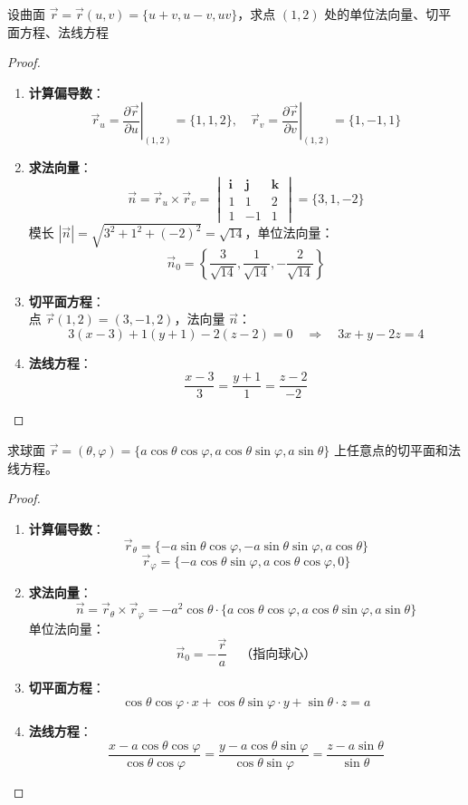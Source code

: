 \documentclass[lang=cn,10pt,thmcnt=section]{elegantbook}
\begin{document}
\begin{example}
	设曲面 $\vec{r} = \vec{r}(u,v) = \{u+v, u-v, uv\}$，求点 $(1,2)$ 处的单位法向量、切平面方程、法线方程 
\end{example}
\begin{proof}
	\begin{enumerate}
		\item \textbf{计算偏导数}：
		\[
			\vec{r}_u = \left.\frac{\partial \vec{r}}{\partial u}\right|_{(1,2)} = \{1, 1, 2\}, \quad 
			\vec{r}_v = \left.\frac{\partial \vec{r}}{\partial v}\right|_{(1,2)} = \{1, -1, 1\}
		\]
		
		\item \textbf{求法向量}：
		\[
			\vec{n} = \vec{r}_u \times \vec{r}_v = \begin{vmatrix}
				\mathbf{i} & \mathbf{j} & \mathbf{k} \\
				1 & 1 & 2 \\
				1 & -1 & 1
			\end{vmatrix} = \{3, 1, -2\}
		\]
		模长 $|\vec{n}| = \sqrt{3^2 + 1^2 + (-2)^2} = \sqrt{14}$，单位法向量：
		\[
			\vec{n}_0 = \left\{\frac{3}{\sqrt{14}}, \frac{1}{\sqrt{14}}, -\frac{2}{\sqrt{14}}\right\}
		\]
		
		\item \textbf{切平面方程}：\\
		点 $\vec{r}(1,2) = (3, -1, 2)$，法向量 $\vec{n}$：
		\[
			3(x-3) + 1(y+1) - 2(z-2) = 0 \quad \Rightarrow \quad 3x + y - 2z = 4
		\]
		
		\item \textbf{法线方程}：
		\[
			\frac{x-3}{3} = \frac{y+1}{1} = \frac{z-2}{-2}
		\]
	\end{enumerate}
\end{proof}
\begin{example}
	求球面 $\vec{r} = ( \theta, \varphi ) = \{a\cos\theta\cos\varphi, a\cos\theta\sin\varphi, a\sin\theta \}$ 上任意点的切平面和法线方程。
\end{example}
\begin{proof}
	\begin{enumerate}
		\item \textbf{计算偏导数}：
		\[
			\vec{r}_\theta = \{-a\sin\theta\cos\varphi, -a\sin\theta\sin\varphi, a\cos\theta\}
		\]
		\[
			\vec{r}_\varphi = \{-a\cos\theta\sin\varphi, a\cos\theta\cos\varphi, 0\}
		\]
		
		\item \textbf{求法向量}：
		\[
			\vec{n} = \vec{r}_\theta \times \vec{r}_\varphi = -a^2\cos\theta \cdot \{a\cos\theta\cos\varphi, a\cos\theta\sin\varphi, a\sin\theta\}
		\]
		单位法向量：
		\[
			\vec{n}_0 = -\frac{\vec{r}}{a} \quad \text{（指向球心）}
		\]
		
		\item \textbf{切平面方程}：
		\[
			\cos\theta\cos\varphi \cdot x + \cos\theta\sin\varphi \cdot y + \sin\theta \cdot z = a
		\]
		
		\item \textbf{法线方程}：
		\[
			\frac{x - a\cos\theta\cos\varphi}{\cos\theta\cos\varphi} = \frac{y - a\cos\theta\sin\varphi}{\cos\theta\sin\varphi} = \frac{z - a\sin\theta}{\sin\theta}
		\]
	\end{enumerate}
\end{proof}
\end{document}

